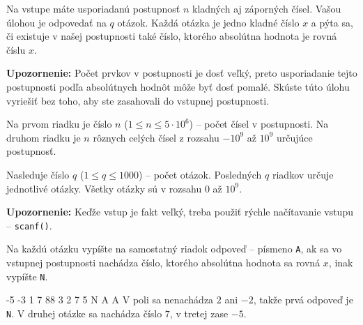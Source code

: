 




Na vstupe máte usporiadanú postupnosť $n$ kladných aj záporných čísel. Vašou úlohou je odpovedať na
$q$ otázok. Každá otázka je jedno kladné číslo $x$ a pýta sa, či existuje v našej postupnosti také
číslo, ktorého absolútna hodnota je rovná číslu $x$.

\textbf{Upozornenie:} Počet prvkov v postupnosti je dosť veľký, preto usporiadanie tejto postupnosti
podľa absolútnych hodnôt môže byť dosť pomalé. Skúste túto úlohu vyriešiť bez toho, aby ste
zasahovali do vstupnej postupnosti.


Na prvom riadku je číslo $n$ ($1 \leq n \leq 5\cdot 10^6$) -- počet čísel v postupnosti.
Na druhom riadku je $n$ rôznych celých čísel z rozsahu $-10^9$ až $10^9$ určujúce postupnosť.

Nasleduje číslo $q$ ($1 \leq q \leq 1000$) -- počet otázok. Posledných $q$ riadkov určuje jednotlivé
otázky. Všetky otázky sú v rozsahu $0$ až $10^9$.

\textbf{Upozornenie:} Keďže vstup je fakt veľký, treba použiť rýchle načítavanie vstupu --
\texttt{scanf()}.


Na každú otázku vypíšte na samostatný riadok odpoveď -- písmeno \texttt{A}, ak sa vo vstupnej
postupnosti nachádza číslo, ktorého absolútna hodnota sa rovná $x$, inak vypíšte \texttt{N}. 


-5 -3 1 7 88
3
2
7
5
\vystup
N
A
A
\komentar
V poli sa nenachádza $2$ ani $-2$, takže prvá odpoveď je \texttt{N}. V druhej otázke sa nachádza
číslo $7$, v tretej zase $-5$.
\koniec


